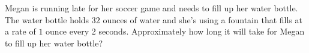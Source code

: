 \documentclass{ximera}
\author{Carolyn Johns}
\begin{document}
  \begin{exercise}
Megan is running late for her soccer game and needs to fill up her water bottle.  The water bottle holds $32$ ounces of water and she's using a fountain that fills at a rate of $1$ ounce every 2 seconds. Approximately how long it will take for Megan to fill up her water bottle?


\begin{multipleChoice}
\end{multipleChoice}

 \end{exercise}
\end{document}

